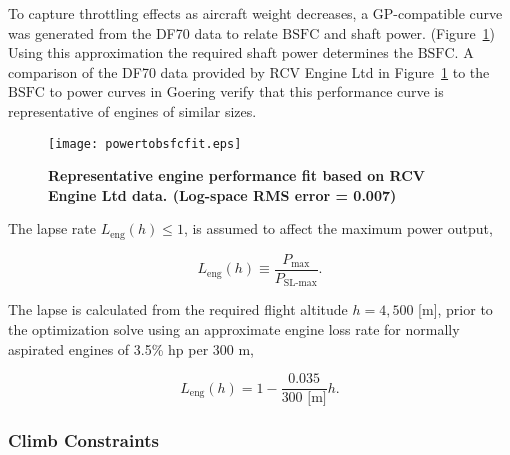 To capture throttling effects as aircraft weight decreases, a GP-compatible curve was generated from the DF70 data to relate $\text{BSFC}$ and shaft power. (Figure~\ref{f:powertobsfc})
Using this approximation the required shaft power determines the $\text{BSFC}$.
A comparison of the DF70 data provided by RCV Engine Ltd in Figure~\ref{f:powertobsfc} to the $\text{BSFC}$ to power curves in Goering\cite{bsfcperf} verify that this performance curve is representative of engines of similar sizes. 



\begin{figure}[h!]
	\begin{center}
	\texttt{[image: powertobsfcfit.eps]}
    \caption{\textbf{Representative engine performance fit based on RCV Engine Ltd data.  (Log-space RMS error = 0.007) }}
	\label{f:powertobsfc}
	\end{center}
\end{figure}

The lapse rate $L_{\text{eng}}(h) \leq 1$, is assumed to affect the maximum power output,

\begin{equation}
    \label{e:lapse}
    L_{\text{eng}}(h) \equiv \frac{P_{\text{max}}}{P_{\text{SL-max}}}.
\end{equation}

The lapse is calculated from the required flight altitude $h=4,500$ [m], prior to the optimization solve using an approximate engine loss rate for normally aspirated engines of 3.5\% hp per 300 m,\cite{enginelapse}

\begin{equation}
    \label{e:lapsefit}
    L_{\text{eng}}(h) = 1 - \frac{0.035}{300 \text{ [m]}} h.
\end{equation}

\subsubsection{Climb Constraints}

